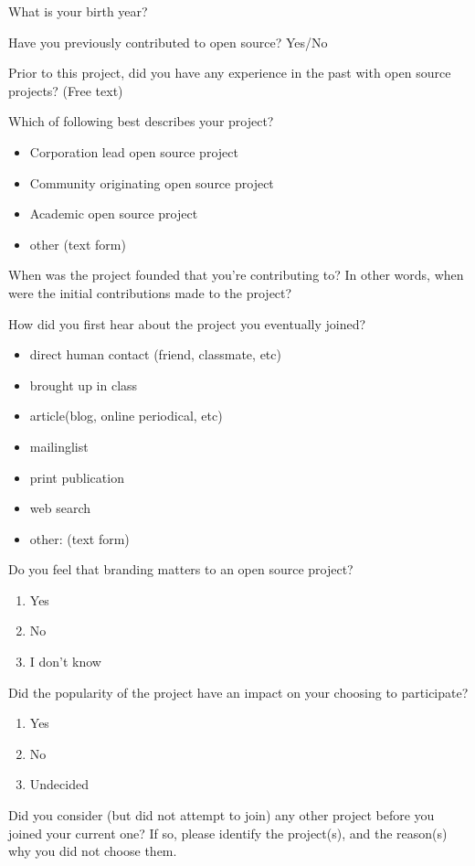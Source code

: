 \begin{table}
What is your birth year?

Have you previously contributed to open source? Yes/No

Prior to this project, did you have any experience in the past with open source projects? (Free text)

Which of following best describes your project?
\begin{itemize}
\item Corporation lead open source project
\item Community originating open source project
\item Academic open source project
\item other (text form)
\end{itemize}
  
  
When was the project founded that you're contributing to? In other words, when were the initial contributions made to the project?

How did you first hear about the project you eventually joined?
\begin{itemize}
\item direct human contact (friend, classmate, etc)
\item  brought up in class
\item article(blog, online periodical, etc)
\item mailinglist
\item print publication
\item web search
\item other: (text form)
\end{itemize}

Do you feel that branding matters to an open source project?
\begin{enumerate}
\item Yes
\item No
\item I don't know
\end{enumerate}

 Did the popularity of the project have an impact on your choosing to participate?
\begin{enumerate}
\item Yes
\item No
\item Undecided
\end{enumerate}

 Did you consider (but did not attempt to join) any other project before you joined your current one? If so, please identify the project(s), and the reason(s) why you did not choose them.


\end{table}
